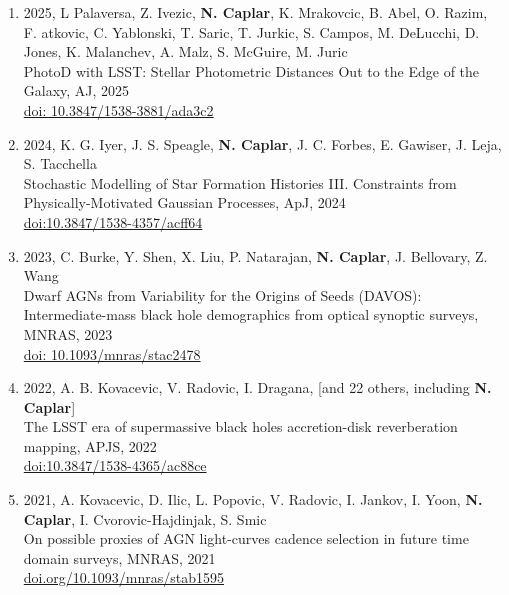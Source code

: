 \documentclass[11pt,letterpaper]{article}
\begin{document}
\begin{enumerate}

\item 2025, L Palaversa, Z. Ivezic, \textbf{N. Caplar}, K. Mrakovcic, B. Abel, O. Razim, F. atkovic, C. Yablonski, T. Saric, T. Jurkic, S. Campos, M. DeLucchi, D. Jones, K. Malanchev, A. Malz, S. McGuire, M. Juric   \\
PhotoD with LSST: Stellar Photometric Distances Out to the Edge of the Galaxy,  AJ, 2025\\
\href{https://ui.adsabs.harvard.edu/link_gateway/2025AJ....169..119P/doi:10.3847/1538-3881/ada3c2}{doi: 10.3847/1538-3881/ada3c2} \\

\item 2024, K. G. Iyer, J. S. Speagle, \textbf{N. Caplar}, J. C. Forbes, E. Gawiser, J. Leja, S. Tacchella   \\
Stochastic Modelling of Star Formation Histories III. Constraints from Physically-Motivated Gaussian Processes,  ApJ, 2024\\
\href{https://ui.adsabs.harvard.edu/link_gateway/2024ApJ...961...53I/doi:10.3847/1538-4357/acff64}{doi:10.3847/1538-4357/acff64} \\

\item 2023, C. Burke, Y. Shen, X. Liu, P. Natarajan, \textbf{N. Caplar}, J. Bellovary, Z. Wang   \\
Dwarf AGNs from Variability for the Origins of Seeds (DAVOS): Intermediate-mass black hole demographics from optical synoptic surveys,  MNRAS, 2023 \\
\href{https://ui.adsabs.harvard.edu/link_gateway/2022MNRAS.tmp.2505B/doi:10.1093/mnras/stac2478}{doi: 
10.1093/mnras/stac2478} \\


\item 2022, A. B. Kovacevic, V. Radovic, I. Dragana,  [and 22 others, including  \textbf{N. Caplar}] \\
The LSST era of supermassive black holes accretion-disk reverberation mapping, APJS, 2022 \\
\href{https://ui.adsabs.harvard.edu/link_gateway/2022ApJS..262...49K/doi:10.3847/1538-4365/ac88ce}{doi:10.3847/1538-4365/ac88ce} \\






\item 2021, A. Kovacevic, D. Ilic, L. Popovic, V. Radovic, I. Jankov, I. Yoon,  \textbf{N. Caplar}, I. Cvorovic-Hajdinjak, S. Smic   \\
On possible proxies of AGN light-curves cadence selection in future time domain surveys,  MNRAS, 2021\\
\href{https://doi.org/10.1093/mnras/stab1595}{doi.org/10.1093/mnras/stab1595} \\


\end{enumerate}
\end{document}
